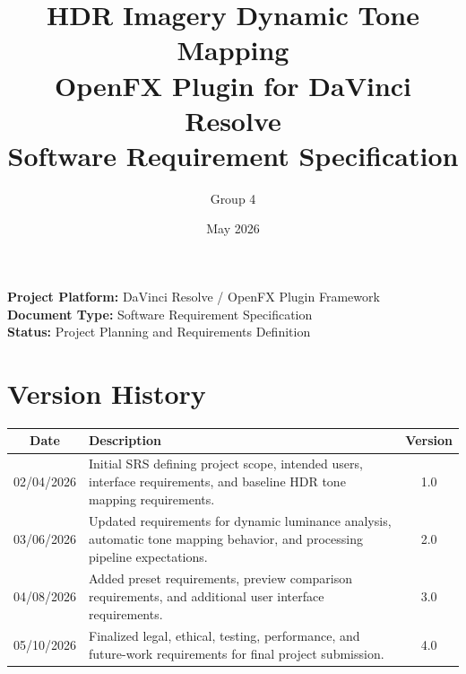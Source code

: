 \documentclass[12pt]{article}
\title{HDR Imagery Dynamic Tone Mapping \\ OpenFX Plugin for DaVinci Resolve \\ Software Requirement Specification}
\author{Group 4}
\date{May 2026}
\begin{document}
\hypersetup{pageanchor=false}

\begin{titlepage}
\maketitle
\thispagestyle{empty}
\vfill
\begin{center}
\textbf{Project Platform:} DaVinci Resolve / OpenFX Plugin Framework\\
\textbf{Document Type:} Software Requirement Specification\\
\textbf{Status:} Project Planning and Requirements Definition
\end{center}
\end{titlepage}

\thispagestyle{empty}
\tableofcontents
\newpage
\hypersetup{pageanchor=true}


\section*{Version History}

\begin{table}[H]
\centering
\renewcommand{\arraystretch}{1.4}
\begin{tabular}{|c|p{8cm}|c|}
    \hline
    \textbf{Date} & \textbf{Description} & \textbf{Version} \\
    \hline
    02/04/2026 & Initial SRS defining project scope, intended users, interface requirements, and baseline HDR tone mapping requirements. & 1.0 \\
    \hline
    03/06/2026 & Updated requirements for dynamic luminance analysis, automatic tone mapping behavior, and processing pipeline expectations. & 2.0 \\
    \hline
    04/08/2026 & Added preset requirements, preview comparison requirements, and additional user interface requirements. & 3.0 \\
    \hline
    05/10/2026 & Finalized legal, ethical, testing, performance, and future-work requirements for final project submission. & 4.0 \\
    \hline
\end{tabular}
\end{table}

\end{document}
